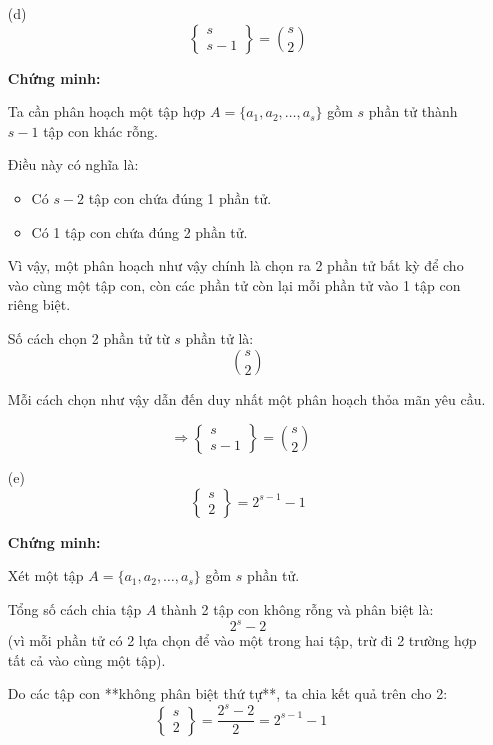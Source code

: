 \documentclass{article}
\begin{document}
	\begin{enumerate}
		\item[(d)]
		\[
		\left\{ \begin{matrix}
			s \\
			s - 1
		\end{matrix} \right\} = \binom{s}{2}
		\]
		
		\textbf{Chứng minh:}
		
		Ta cần phân hoạch một tập hợp $A = \{a_1, a_2, \ldots, a_s\}$ gồm $s$ phần tử thành $s - 1$ tập con khác rỗng.
		
		Điều này có nghĩa là:
		\begin{itemize}
			\item Có $s - 2$ tập con chứa đúng 1 phần tử.
			\item Có 1 tập con chứa đúng 2 phần tử.
		\end{itemize}
		
		Vì vậy, một phân hoạch như vậy chính là chọn ra 2 phần tử bất kỳ để cho vào cùng một tập con, còn các phần tử còn lại mỗi phần tử vào 1 tập con riêng biệt.
		
		Số cách chọn 2 phần tử từ $s$ phần tử là:
		\[
		\binom{s}{2}
		\]
		
		Mỗi cách chọn như vậy dẫn đến duy nhất một phân hoạch thỏa mãn yêu cầu.
		
		\[
		\Rightarrow \left\{ \begin{matrix}
			s \\
			s - 1
		\end{matrix} \right\} = \binom{s}{2} \quad 
		\]
	\end{enumerate}
	
	\begin{enumerate}
		\item[(e)] 
		\[
		\left\{ \begin{matrix}
			s \\
			2
		\end{matrix} \right\} = 2^{s - 1} - 1
		\]
		
		\textbf{Chứng minh:}
		
		Xét một tập $A = \{a_1, a_2, \ldots, a_s\}$ gồm $s$ phần tử.
		
		Tổng số cách chia tập $A$ thành 2 tập con không rỗng và phân biệt là:
		\[
		2^s - 2
		\]
		(vì mỗi phần tử có 2 lựa chọn để vào một trong hai tập, trừ đi 2 trường hợp tất cả vào cùng một tập).
		
		Do các tập con **không phân biệt thứ tự**, ta chia kết quả trên cho 2:
		\[
		\left\{ \begin{matrix}
			s \\
			2
		\end{matrix} \right\} = \frac{2^s - 2}{2} = 2^{s-1} - 1 \quad 
		\]
	\end{enumerate}
	
\end{document}
